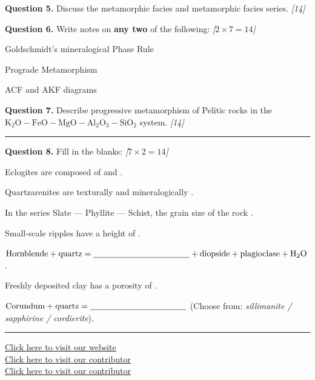 \documentclass[11pt,a4paper]{article}
\newcommand{\pts}[1]{\hfill   \textit{[#1]}}
\begin{document}
\medskip


\noindent   \textbf{Question 5.} Discuss the metamorphic facies and metamorphic facies series. \pts{14}

\medskip


\noindent   \textbf{Question 6.} Write notes on   \textbf{any two} of the following: \pts{$2  \times 7 = 14$}

\begin{parts}
  \item Goldschmidt's mineralogical Phase Rule
  \item Prograde Metamorphism
  \item ACF and AKF diagrams
\end{parts}

\medskip


\noindent   \textbf{Question 7.} Describe progressive metamorphism of Pelitic rocks in the $ \text{K}_2 \text{O}- \text{FeO}- \text{MgO}- \text{Al}_2 \text{O}_3- \text{SiO}_2$ system. \pts{14}

\bigskip


\rule{\linewidth}{0.4pt}\smallskip




\noindent   \textbf{Question 8.} Fill in the blanks: \pts{$7  \times 2 = 14$}

\begin{parts}
  \item Eclogites are composed of \underline{\hspace{5cm}} and \underline{\hspace{5cm}}.
  \item Quartzarenites are texturally \underline{\hspace{3cm}} and mineralogically \underline{\hspace{3cm}}.
  \item In the series Slate --- Phyllite --- Schist, the grain size of the rock \underline{\hspace{4cm}}.
  \item Small-scale ripples have a height of \underline{\hspace{4cm}}.
  \item $ \text{Hornblende} +  \text{quartz} =  \text{\underline{\hspace{4cm}}} +  \text{diopside} +  \text{plagioclase} +  \text{H}_2 \text{O}$.
  \item Freshly deposited clay has a porosity of \underline{\hspace{4cm}}.
  \item $ \text{Corundum} +  \text{quartz} =  \text{\underline{\hspace{4cm}}}$ (Choose from:   \textit{sillimanite / sapphirine / cordierite}).
\end{parts}

\vfill\rule{\linewidth}{0.4pt}

\begin{center}\small
\href{https://bhu-exam.vercel.app/}{Click here to visit our website}\\[4pt]
\href{https://me-aryan.vercel.app/}{Click here to visit our contributor}\\[4pt]
\href{https://quashan-me.vercel.app/}{Click here to visit our contributor}
\end{center}
\end{document}
